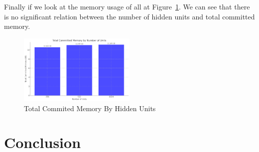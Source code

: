 \documentclass{LSkill}
\begin{document}
Finally if we look at the memory usage of all at Figure~\ref{fig:Total Commited Memory By Hidden Units}. We can see that there is no significant relation between the number of hidden units and total committed memory.

\begin{figure}[htbp]
    \centering
    \includegraphics[width=0.5\textwidth]{figure 11.png} 
    \caption{Total Commited Memory By Hidden Units}
    \label{fig:Total Commited Memory By Hidden Units}
\end{figure}


\section{Conclusion}


\end{document}
